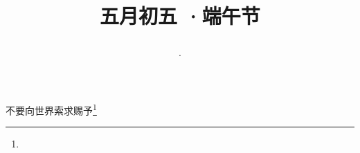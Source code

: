 \title{\date[d=10,m=6,y=2024][year:cn-y,年,month:cn,day:cn,日,·,weekday]·五月初五 ·端午节}
不要向世界索求赐予\footnote{ }


